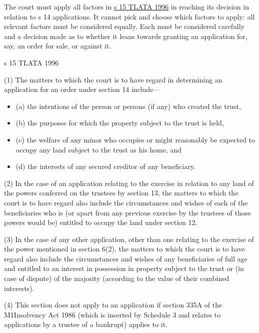 \documentclass[
]{article}
\providecommand{\tightlist}{%
  \setlength{\itemsep}{0pt}\setlength{\parskip}{0pt}}
\newenvironment{env-9843ce55-0506-497d-95ba-03a690b05b3c}
{
    \savenotes\tcolorbox[blanker,breakable,left=5pt,borderline west={2pt}{-4pt}{green}]
}
{
    \endtcolorbox\spewnotes
}
\begin{document}
The court must apply all factors in
\href{https://www.legislation.gov.uk/ukpga/1996/47/section/15}{s 15
TLATA 1996} in reaching its decision in relation to s 14 applications.
It cannot pick and choose which factors to apply: all relevant factors
must be considered equally. Each must be considered carefully and a
decision made as to whether it leans towards granting an application
for, say, an order for sale, or against it.

\begin{env-9843ce55-0506-497d-95ba-03a690b05b3c}

s 15 TLATA 1996

(1) The matters to which the court is to have regard in determining an
application for an order under section 14 include---

\begin{itemize}
\tightlist
\item
  (a) the intentions of the person or persons (if any) who created the
  trust,
\item
  (b) the purposes for which the property subject to the trust is held,
\item
  (c) the welfare of any minor who occupies or might reasonably be
  expected to occupy any land subject to the trust as his home, and
\item
  (d) the interests of any secured creditor of any beneficiary.
\end{itemize}

(2) In the case of an application relating to the exercise in relation
to any land of the powers conferred on the trustees by section 13, the
matters to which the court is to have regard also include the
circumstances and wishes of each of the beneficiaries who is (or apart
from any previous exercise by the trustees of those powers would be)
entitled to occupy the land under section 12.

(3) In the case of any other application, other than one relating to the
exercise of the power mentioned in section 6(2), the matters to which
the court is to have regard also include the circumstances and wishes of
any beneficiaries of full age and entitled to an interest in possession
in property subject to the trust or (in case of dispute) of the majority
(according to the value of their combined interests).

(4) This section does not apply to an application if section 335A of the
M1Insolvency Act 1986 (which is inserted by Schedule 3 and relates to
applications by a trustee of a bankrupt) applies to it.

\end{env-9843ce55-0506-497d-95ba-03a690b05b3c}
\end{document}
